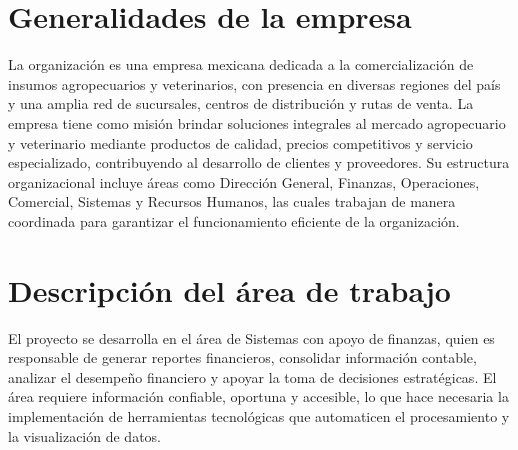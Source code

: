 \section{Generalidades de la empresa}

La organización es una empresa mexicana dedicada a la comercialización de insumos agropecuarios y veterinarios, con presencia en diversas regiones del país y una amplia red de sucursales, centros de distribución y rutas de venta. La empresa tiene como misión brindar soluciones integrales al mercado agropecuario y veterinario mediante productos de calidad, precios competitivos y servicio especializado, contribuyendo al desarrollo de clientes y proveedores. Su estructura organizacional incluye áreas como Dirección General, Finanzas, Operaciones, Comercial, Sistemas y Recursos Humanos, las cuales trabajan de manera coordinada para garantizar el funcionamiento eficiente de la organización.

\section{Descripción del área de trabajo}

El proyecto se desarrolla en el área de Sistemas con apoyo de finanzas, quien es responsable de generar reportes financieros, consolidar información contable, analizar el desempeño financiero y apoyar la toma de decisiones estratégicas. El área requiere información confiable, oportuna y accesible, lo que hace necesaria la implementación de herramientas tecnológicas que automaticen el procesamiento y la visualización de datos.
